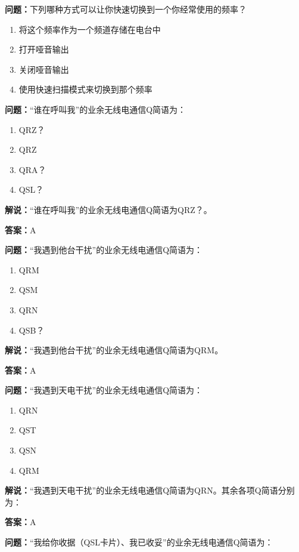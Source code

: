 \documentclass[UTF8]{ctexbook}
\begin{document}
\textbf{问题：}下列哪种方式可以让你快速切换到一个你经常使用的频率？
\begin{enumerate}[label=\Alph*), leftmargin=3em]
  \item 将这个频率作为一个频道存储在电台中
  \item 打开哑音输出
  \item 关闭哑音输出
  \item 使用快速扫描模式来切换到那个频率
\end{enumerate}

\textbf{问题：}“谁在呼叫我”的业余无线电通信Q简语为：

\begin{enumerate}[label=\Alph*), leftmargin=3em]
  \item QRZ？
  \item QRZ
  \item QRA？
  \item QSL？
\end{enumerate}

\textbf{解说：}“谁在呼叫我”的业余无线电通信Q简语为QRZ？。

\textbf{答案：}A

\textbf{问题：}“我遇到他台干扰”的业余无线电通信Q简语为：

\begin{enumerate}[label=\Alph*), leftmargin=3em]
  \item QRM
  \item QSM
  \item QRN
  \item QSB？
\end{enumerate}

\textbf{解说：}“我遇到他台干扰”的业余无线电通信Q简语为QRM。

\textbf{答案：}A

\textbf{问题：}“我遇到天电干扰”的业余无线电通信Q简语为：

\begin{enumerate}[label=\Alph*), leftmargin=3em]
  \item QRN
  \item QST
  \item QSN
  \item QRM
\end{enumerate}

\textbf{解说：}“我遇到天电干扰”的业余无线电通信Q简语为QRN。其余各项Q简语分别为：

\textbf{答案：}A

\textbf{问题：}“我给你收据（QSL卡片）、我已收妥”的业余无线电通信Q简语为：
\end{document}
